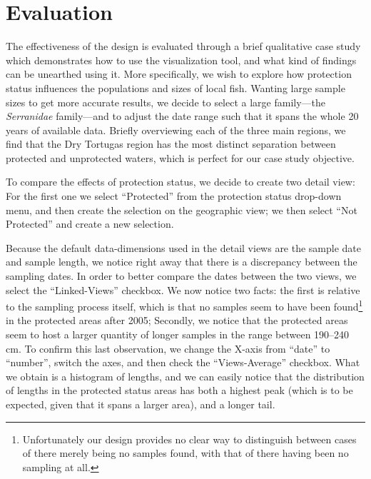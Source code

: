 \documentclass[letterpaper]{article} %
\begin{document}

\section{Evaluation} \label{sec:evaluation}

The effectiveness of the design is evaluated through a brief qualitative case
study which demonstrates how to use the visualization tool, and what kind of
findings can be unearthed using it.  More specifically, we wish to explore how
protection status influences the populations and sizes of local fish.  Wanting
large sample sizes to get more accurate results, we decide to select a large
family---the \emph{Serranidae} family---and to adjust the date range such that
it spans the whole 20 years of available data.  Briefly overviewing each of the
three main regions, we find that the Dry Tortugas region has the most distinct
separation between protected and unprotected waters, which is perfect for our
case study objective.

To compare the effects of protection status, we decide to create two detail
view:  For the first one we select ``Protected'' from the protection status
drop-down menu, and then create the selection on the geographic view;  we then
select ``Not Protected'' and create a new selection.

Because the default data-dimensions used in the detail views are the sample
date and sample length, we notice right away that there is a discrepancy
between the sampling dates.  In order to better compare the dates between the
two views, we select the ``Linked-Views'' checkbox.  We now notice two facts:
the first is relative to the sampling process itself, which is that no samples
seem to have been found\footnote{Unfortunately our design provides no clear way
  to distinguish between cases of there merely being no samples found, with
that of there having been no sampling at all.} in the protected areas after
2005;  Secondly, we notice that the protected areas seem to host a larger
quantity of longer samples in the range between 190--240 cm.  To confirm this
last observation, we change the X-axis from ``date'' to ``number'', switch the
axes, and then check the ``Views-Average'' checkbox.  What we obtain is
a histogram of lengths, and we can easily notice that the distribution of
lengths in the protected status areas has both a highest peak (which is to be
expected, given that it spans a larger area), and a longer tail.
\end{document}
